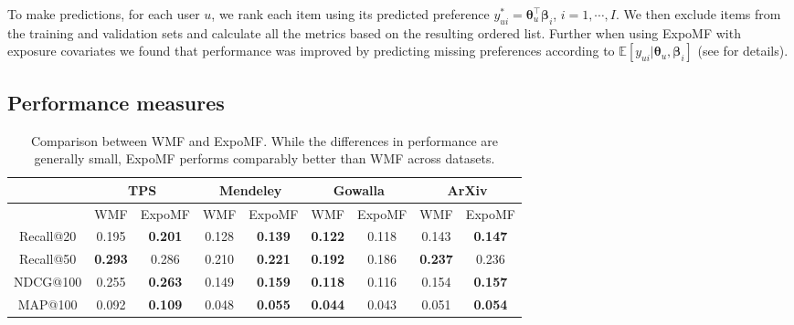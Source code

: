 To make predictions, for each user $u$, we rank each item using its predicted
preference ${y}^*_{ui} = \boldsymbol\theta_u^\top \boldsymbol\beta_i$, $i = 1, \cdots, I$.
We then exclude items from the training and validation sets and calculate all the
metrics based on the resulting ordered list. Further when using
ExpoMF with exposure covariates we found that performance was improved by predicting missing preferences
according to $\mathbb{E}[y_{ui}|\boldsymbol\theta_u,\boldsymbol\beta_i]$ (see  for details).

\subsection{Performance measures}

\begin{table}
\centering
\begin{tabular}{ c | c c | c c | c c | c c  }
   & \multicolumn{2}{c}{\textbf{TPS}} & \multicolumn{2}{c}{\textbf{Mendeley}} & \multicolumn{2}{c}{\textbf{Gowalla}} & \multicolumn{2}{c}{\textbf{ArXiv}} \\ \hline
    & WMF & ExpoMF	& WMF & ExpoMF 	& WMF& ExpoMF &	 WMF & ExpoMF \\ \hline
  Recall@20 &  0.195 &  \textbf{0.201}              & 0.128 &  \textbf{0.139}                & \textbf{0.122} & 0.118                          &  0.143 & \textbf{0.147} \\
  Recall@50 &  \textbf{0.293} &  0.286              & 0.210 & \textbf{0.221}                  & \textbf{0.192} & 0.186                         & \textbf{0.237} & 0.236 \\
  NDCG@100  &  0.255 &  \textbf{0.263}              & 0.149 & \textbf{0.159}                 & \textbf{0.118} & 0.116                         & 0.154 & \textbf{0.157} \\
  MAP@100   &  0.092 &  \textbf{0.109}             & 0.048 & \textbf{0.055}                  & \textbf{0.044} & 0.043                         & 0.051 & \textbf{0.054}\\
\end{tabular}
\caption{Comparison between WMF \cite{hu2008collaborative} and ExpoMF. While
the differences in performance are generally small, ExpoMF performs comparably better than WMF across datasets.}
\label{tab:cfresults}
\end{table}

